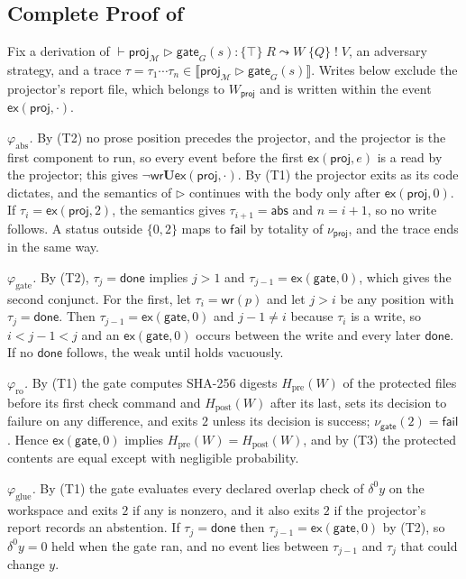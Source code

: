 \documentclass[11pt]{article}
\theoremstyle{definition}
\theoremstyle{plain}
\newcommand{\Mcal}{\mathcal{M}}
\newcommand{\fail}{\mathsf{fail}}
\newcommand{\sem}[1]{\llbracket #1 \rrbracket}
\newcommand{\gate}{\mathsf{gate}}
\newcommand{\proj}{\mathsf{proj}}
\newcommand{\ex}{\mathsf{ex}}
\newcommand{\wrt}{\mathsf{wr}}
\newcommand{\done}{\mathsf{done}}
\newcommand{\abs}{\mathsf{abs}}
\newcommand{\LTLU}{\mathbin{\mathbf{U}}}
\newcommand{\hoare}[5]{\vdash #1 : \{#2\}\; #3 \leadsto #4\; \{#5\}}
\begin{document}
\subsection{Complete Proof of \texorpdfstring{}{Theorem 5}}
Fix a derivation of $\hoare{\proj_{\Mcal} \triangleright \gate_G(s)}{\top}{R}{W}{Q} \;!\; V$, an adversary strategy, and a trace $\tau = \tau_1 \cdots \tau_n \in \sem{\proj_{\Mcal} \triangleright \gate_G(s)}$. Writes below exclude the projector's report file, which belongs to $W_{\proj}$ and is written within the event $\ex(\proj, \cdot)$.

\emph{$\varphi_{\mathrm{abs}}$.} By (T2) no prose position precedes the projector, and the projector is the first component to run, so every event before the first $\ex(\proj, e)$ is a read by the projector; this gives $\lnot \wrt \LTLU \ex(\proj, \cdot)$. By (T1) the projector exits as its code dictates, and the semantics of $\triangleright$ continues with the body only after $\ex(\proj, 0)$. If $\tau_i = \ex(\proj, 2)$, the semantics gives $\tau_{i+1} = \abs$ and $n = i + 1$, so no write follows. A status outside $\{0, 2\}$ maps to $\fail$ by totality of $\nu_{\proj}$, and the trace ends in the same way.

\emph{$\varphi_{\mathrm{gate}}$.} By (T2), $\tau_j = \done$ implies $j > 1$ and $\tau_{j-1} = \ex(\gate, 0)$, which gives the second conjunct. For the first, let $\tau_i = \wrt(p)$ and let $j > i$ be any position with $\tau_j = \done$. Then $\tau_{j-1} = \ex(\gate, 0)$ and $j - 1 \neq i$ because $\tau_i$ is a write, so $i < j - 1 < j$ and an $\ex(\gate, 0)$ occurs between the write and every later $\done$. If no $\done$ follows, the weak until holds vacuously.

\emph{$\varphi_{\mathrm{ro}}$.} By (T1) the gate computes SHA-256 digests $H_{\mathrm{pre}}(W)$ of the protected files before its first check command and $H_{\mathrm{post}}(W)$ after its last, sets its decision to failure on any difference, and exits $2$ unless its decision is success; $\nu_{\gate}(2) = \fail$. Hence $\ex(\gate, 0)$ implies $H_{\mathrm{pre}}(W) = H_{\mathrm{post}}(W)$, and by (T3) the protected contents are equal except with negligible probability.

\emph{$\varphi_{\mathrm{glue}}$.} By (T1) the gate evaluates every declared overlap check of $\delta^0 y$ on the workspace and exits $2$ if any is nonzero, and it also exits $2$ if the projector's report records an abstention. If $\tau_j = \done$ then $\tau_{j-1} = \ex(\gate, 0)$ by (T2), so $\delta^0 y = 0$ held when the gate ran, and no event lies between $\tau_{j-1}$ and $\tau_j$ that could change $y$.
\end{document}
